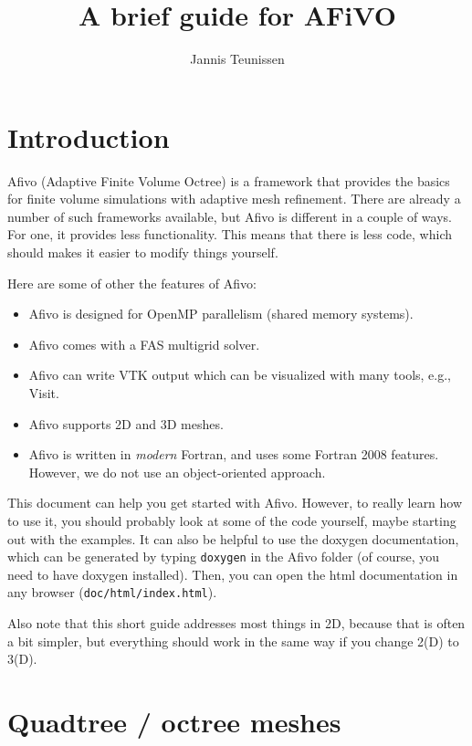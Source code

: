 \documentclass[a4paper, a4wide]{article}
\begin{document}
\lstset{language=bash}
\lstset{basicstyle=\ttfamily, columns=fixed, breaklines=true}

\title{A brief guide for AFiVO}
\author{Jannis Teunissen}
\maketitle

\section{Introduction}
\label{sec:introduction}

Afivo (Adaptive Finite Volume Octree) is a framework that provides the basics
for finite volume simulations with adaptive mesh refinement.
There are already a number of such frameworks available, but Afivo is different
in a couple of ways.
For one, it provides less functionality.
This means that there is less code, which should makes it easier to modify
things yourself.

Here are some of other the features of Afivo:

\begin{itemize}
  \item Afivo is designed for OpenMP parallelism (shared memory systems).
  \item Afivo comes with a FAS multigrid solver.
  \item Afivo can write VTK output which can be visualized with many tools,
  e.g., Visit.
  \item Afivo supports 2D and 3D meshes.
  \item Afivo is written in \emph{modern} Fortran, and uses some Fortran 2008
  features.
  However, we do not use an object-oriented approach.
\end{itemize}

This document can help you get started with Afivo. However, to really learn how
to use it, you should probably look at some of the code yourself, maybe starting
out with the examples. It can also be helpful to use the doxygen documentation,
which can be generated by typing \texttt{doxygen} in the Afivo folder (of course,
you need to have doxygen installed). Then, you can open the html documentation
in any browser (\texttt{doc/html/index.html}).

Also note that this short guide addresses most things in 2D, because that is
often a bit simpler, but everything should work in the same way if you change
2(D) to 3(D).

\section{Quadtree / octree meshes}
\label{sec:amrmesh}
\end{document}
